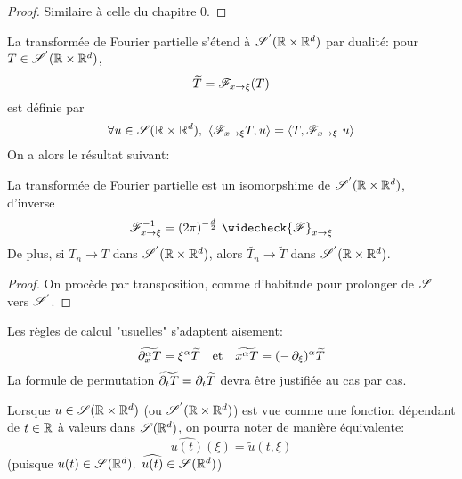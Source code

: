\documentclass[french,a4paper,10pt]{article}
\begin{document}
            \begin{proof}
                Similaire à celle du chapitre 0.
            \end{proof}

            \newpage
            
            La transformée de Fourier partielle s'étend à $\mathscr{S}^{'}(\mathbb{R} \times \mathbb{R}^d)$ par dualité: pour $T\in \mathscr{S}^{'}(\mathbb{R} \times \mathbb{R}^d)$,
            \begin{equation*}
                    \widetilde{T} = \mathscr{F}_{x \to \xi}(T)
            \end{equation*}
            est définie par
            \begin{equation*}
                \forall u \in \scrS\RRd, \ \langle \scrF_{x \to \xi}T,u \rangle = \langle T, \scrF_{x \to \xi}\ u \rangle
            \end{equation*}
            On a alors le résultat suivant:
        
            \begin{proposition}\label{prop:2.3.4}
                La transformée de Fourier partielle est un isomorpshime de $\mathscr{S}^{'}(\mathbb{R} \times \mathbb{R}^d)$, d'inverse 
                \begin{equation*}
                    \scrF_{x \to \xi}^{-1} = (2\pi)^{-\frac{d}{2}} \ \widecheck{\scrF}_{x \to \xi}
                \end{equation*}
                De plus, si $T_n \to T$ dans $\mathscr{S}^{'}(\mathbb{R} \times \mathbb{R}^d)$, alors $\widetilde{T_n} \to \widetilde{T}$ dans $\mathscr{S}^{'}(\mathbb{R} \times \mathbb{R}^d)$.
            \end{proposition}

            \begin{proof}
                On procède par transposition, comme d'habitude pour prolonger de $\mathscr{S}$ vers $\mathscr{S}^{'}$.
            \end{proof}

            \begin{remark}\label{rem:2.3.5}
                Les règles de calcul "usuelles" s'adaptent aisement:
                \begin{equation*}
                    \widetilde{\mathop{}\!{\partial}_x^{\alpha}T} = \xi^{\alpha}\widetilde{T}\ \ \text{ et     } \ \ \widetilde{x^{\alpha} T} = (-\mathop{}\!{\partial}_{\xi})^{\alpha}\widetilde{T}
                \end{equation*}
                \underline{La formule de permutation $\widetilde{\mathop{}\!{\partial}_t T} = \mathop{}\!{\partial}_t \widetilde{T}$ devra être justifiée au cas par cas}.
            \end{remark}

            \begin{remark}\label{rem:2.3.6}
                Lorsque $u \in \mathscr{S}(\mathbb{R} \times \mathbb{R}^d)$ (ou $\mathscr{S}^{'}(\mathbb{R} \times \mathbb{R}^d)$) est vue comme une fonction dépendant de $t\in \mathbb{R}$ à valeurs dans $\mathscr{S}(\mathbb{R}^d)$, on pourra noter de manière équivalente:
                \begin{equation*}
                    \widehat{u(t)}(\xi) = \widetilde{u}(t,\xi)
                \end{equation*}
                (puisque $u(t) \in \scrS(\R^d), \ \widehat{u(t)} \in \scrS(\R^d)$)
            \end{remark}
\end{document}
